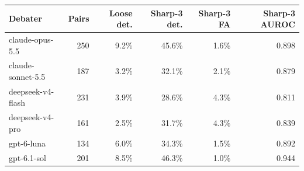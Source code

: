 \begin{tabular}{@{}lrrrrr@{}}
\toprule
Debater & Pairs & Loose det. & Sharp-3 det. & Sharp-3 FA & Sharp-3 AUROC \\
\midrule
claude-opus-5.5 & 250 & 9.2\% & 45.6\% & 1.6\% & 0.898 \\
claude-sonnet-5.5 & 187 & 3.2\% & 32.1\% & 2.1\% & 0.879 \\
deepseek-v4-flash & 231 & 3.9\% & 28.6\% & 4.3\% & 0.811 \\
deepseek-v4-pro & 161 & 2.5\% & 31.7\% & 4.3\% & 0.839 \\
gpt-6-luna & 134 & 6.0\% & 34.3\% & 1.5\% & 0.892 \\
gpt-6.1-sol & 201 & 8.5\% & 46.3\% & 1.0\% & 0.944 \\
\bottomrule
\end{tabular}
